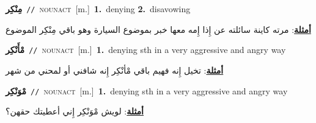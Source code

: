 \documentclass[10pt,a4paper,twoside]{article} %
\begin{document}
\begin{multicols}{2}
{\setlength\topsep{0pt}\textbf{\foreignlanguage{arabic}{مِنْكِر}}\ {\color{gray}\texttt{//}\color{black}}\ \textsc{noun\textunderscore act}\ [m.]\ \textbf{1.}~denying  \textbf{2.}~disavowing\  \begin{flushright}\color{gray}\foreignlanguage{arabic}{\textbf{\underline{\foreignlanguage{arabic}{أمثلة}}}: مرته كاينة سائلته عن إِذا إِمه معها خبر بموضوع السيارة وهو باقي مِنْكِر الموضوع}\end{flushright}\color{black}} \vspace{2mm}

{\setlength\topsep{0pt}\textbf{\foreignlanguage{arabic}{مْأَنْكِر}}\ {\color{gray}\texttt{//}\color{black}}\ \textsc{noun\textunderscore act}\ [m.]\ \textbf{1.}~denying sth in a very aggressive and angry way\  \begin{flushright}\color{gray}\foreignlanguage{arabic}{\textbf{\underline{\foreignlanguage{arabic}{أمثلة}}}: تخيل إِنه فهيم باقي مْأنْكِر إِنه شافني أو لمحني من شهر}\end{flushright}\color{black}} \vspace{2mm}

{\setlength\topsep{0pt}\textbf{\foreignlanguage{arabic}{مْوَنْكِر}}\ {\color{gray}\texttt{//}\color{black}}\ \textsc{noun\textunderscore act}\ [m.]\ \textbf{1.}~denying sth in a very aggressive and angry way\  \begin{flushright}\color{gray}\foreignlanguage{arabic}{\textbf{\underline{\foreignlanguage{arabic}{أمثلة}}}: لويش مْوَنْكِر إِني أعطيتك حقهن؟}\end{flushright}\color{black}} \vspace{2mm}


\end{multicols}
\end{document}
